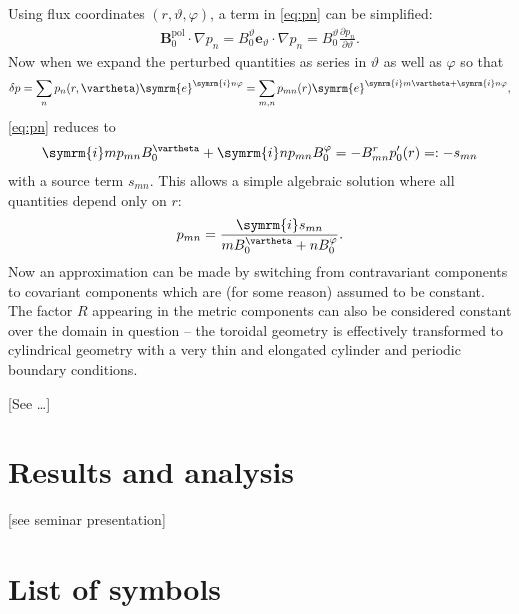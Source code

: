 \documentclass[a4paper, twoside, 10pt, english]{article}
\numberwithin{equation}{section}
\let\temp\varrho
\let\varrho\rho
\let\rho\temp
\let\temp\vartheta
\let\vartheta\theta
\let\theta\temp
\let\temp\varphi
\let\varphi\phi
\let\phi\temp
\let\vec\symbf
\newcommand*\grad{\ensuremath{\nabla}}
\newcommand*\e{\ensuremath{\symrm{e}}}  %
\newcommand*\im{\ensuremath{\symrm{i}}}  %
\newcommand*\pd[2][]{\ensuremath{\frac{\partial #1}{\partial #2}}}  %
\newcommand*\pol{\ensuremath{\textrm{pol}}}  %
\begin{document}
Using flux coordinates $(r, \theta, \phi)$, a term in \cref{eq:pn} can be simplified:
\begin{gather}
  \vec{B}_{0}^{\pol} \cdot \grad p_{n} = B_{0}^{\theta} \vec{e}_{\theta} \cdot \grad p_{n} = B_{0}^{\theta} \pd[p_{n}]{\theta}.
\end{gather}
Now when we expand the perturbed quantities as series in $\theta$ as well as $\phi$ so that
\begin{gather}
  \delta p = \sum_{n} p_n(r, \theta) \e^{\im n \phi} = \sum_{m, n} p_{mn}(r) \e^{\im m \theta + \im n \phi},
\end{gather}
\cref{eq:pn} reduces to
\begin{gather}
  \im m p_{mn} B_{0}^{\theta} + \im n p_{mn} B_{0}^{\phi} = -B_{mn}^{r} p_{0}'(r) =: -s_{mn}
\end{gather}
with a source term $s_{mn}$. This allows a simple algebraic solution where all quantities depend only on $r$:
\begin{gather}
  p_{mn} =  \frac{\im s_{mn}}{m B_{0}^{\theta} + n B_{0}^{\phi}}.
\end{gather}
Now an approximation can be made by switching from contravariant components to covariant components which are (for some reason) assumed to be constant. The factor $R$ appearing in the metric components can also be considered constant over the domain in question -- the toroidal geometry is effectively transformed to cylindrical geometry with a very thin and elongated cylinder and periodic boundary conditions.

[See \cite{Heyn08} \ldots]

\clearpage
\section{Results and analysis}
\label{sec:results}

[see seminar presentation]

\clearpage
\appendix
\section{List of symbols}
\end{document}
